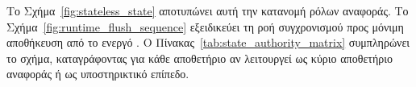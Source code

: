 Το Σχήμα~\ref{fig:stateless_state} αποτυπώνει αυτή την κατανομή ρόλων αναφοράς. Το Σχήμα~\ref{fig:runtime_flush_sequence} εξειδικεύει τη ροή συγχρονισμού προς μόνιμη αποθήκευση από το ενεργό . Ο Πίνακας~\ref{tab:state_authority_matrix} συμπληρώνει το σχήμα, καταγράφοντας για κάθε αποθετήριο αν λειτουργεί ως κύριο αποθετήριο αναφοράς ή ως υποστηρικτικό επίπεδο.




\begin{table}[H]
\centering
\caption{Ρόλοι αναφοράς και λειτουργίες των αποθετηρίων κατάστασης στην υλοποίηση}
\label{tab:state_authority_matrix}

\end{table}
